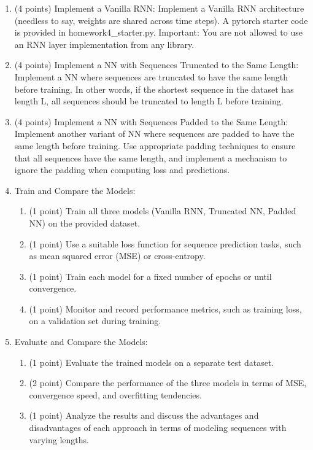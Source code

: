 \documentclass[
  letterpaper,
  DIV=11,
  numbers=noendperiod]{scrartcl}
\providecommand{\tightlist}{%
  \setlength{\itemsep}{0pt}\setlength{\parskip}{0pt}}\usepackage{longtable,booktabs,array}
\begin{document}
\begin{enumerate}
\def\labelenumi{\arabic{enumi}.}
\item
  (4 points) Implement a Vanilla RNN: Implement a Vanilla RNN
  architecture (needless to say, weights are shared across time steps).
  A pytorch starter code is provided in homework4\_starter.py.
  Important: You are not allowed to use an RNN layer implementation from
  any library.
\item
  (4 points) Implement a NN with Sequences Truncated to the Same Length:
  Implement a NN where sequences are truncated to have the same length
  before training. In other words, if the shortest sequence in the
  dataset has length L, all sequences should be truncated to length L
  before training.
\item
  (4 points) Implement a NN with Sequences Padded to the Same Length:
  Implement another variant of NN where sequences are padded to have the
  same length before training. Use appropriate padding techniques to
  ensure that all sequences have the same length, and implement a
  mechanism to ignore the padding when computing loss and predictions.
\item
  Train and Compare the Models:

  \begin{enumerate}
  \def\labelenumii{(\alph{enumii})}
  \tightlist
  \item
    (1 point) Train all three models (Vanilla RNN, Truncated NN, Padded
    NN) on the provided dataset.
  \item
    (1 point) Use a suitable loss function for sequence prediction
    tasks, such as mean squared error (MSE) or cross-entropy.
  \item
    (1 point) Train each model for a fixed number of epochs or until
    convergence.
  \item
    (1 point) Monitor and record performance metrics, such as training
    loss, on a validation set during training.
  \end{enumerate}
\item
  Evaluate and Compare the Models:

  \begin{enumerate}
  \def\labelenumii{(\alph{enumii})}
  \tightlist
  \item
    (1 point) Evaluate the trained models on a separate test dataset.
  \item
    (2 point) Compare the performance of the three models in terms of
    MSE, convergence speed, and overfitting tendencies.
  \item
    (1 point) Analyze the results and discuss the advantages and
    disadvantages of each approach in terms of modeling sequences with
    varying lengths.
  \end{enumerate}
\end{enumerate}
\end{document}
